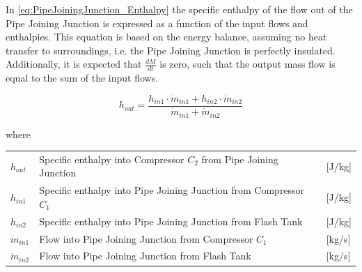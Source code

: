 In \cref{eq:PipeJoiningJunction_Enthalpy} the specific enthalpy of the flow out of the Pipe Joining Junction is expressed as a function of the input flows and enthalpies. This equation is based on the energy balance, assuming no heat transfer to surroundings, i.e. the Pipe Joining Junction is perfectly insulated. Additionally, it is expected that $\frac{dM}{dt}$ is zero, such that the output mass flow is equal to the sum of the input flows.

\begin{equation} \label{eq:PipeJoiningJunction_Enthalpy}
	h_{out} = \frac{h_{in1} \cdot \dot{m}_{in1} + h_{in2} \cdot \dot{m}_{in2}}{ \dot{m}_{in1} + \dot{m}_{in2} }
\end{equation}

where

\begin{center}
	\begin{tabular}{l p{10cm} l}
		$h_{out}$ 			& Specific enthalpy into Compressor $ C_2 $ from Pipe Joining Junction 			& [\si{J}/\si{kg}]\\
		$h_{in1}$ 			& Specific enthalpy into Pipe Joining Junction from Compressor $ C_1 $  					& [\si{J}/\si{kg}]\\
		$h_{in2}$ 			& Specific enthalpy into Pipe Joining Junction from Flash Tank   				& [\si{J}/\si{kg}]\\
		$\dot{m}_{in1}$ 	& Flow into Pipe Joining Junction from Compressor $ C_1 $ 		& [\si{kg}/\si{s}]\\
		$\dot{m}_{in2}$ 	& Flow into Pipe Joining Junction from Flash Tank 				& [\si{kg}/\si{s}]\\
	\end{tabular}
\end{center}



